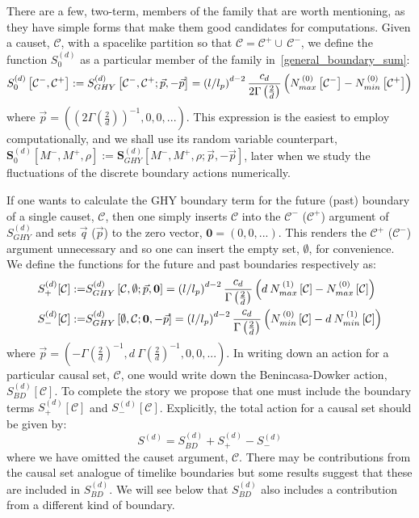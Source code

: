 \documentclass[12pt]{article}
\newcommand{\be}{\begin{equation}}
\newcommand{\ee}{\end{equation}}
\begin{document}
There are a few, two-term, members of the family that are worth mentioning, as they have simple forms that make them good candidates for computations. Given a causet, $\mathcal{C}$, with a spacelike partition so that $\mathcal C = \mathcal C^+ \cup\, \mathcal C^-$, we define the function $S^{ (d)}_0$ as a particular member of the family in~\eqref{general_boundary_sum}:
\be\label{eq:min_max_simple_formula}
S^{ (d)}_{0}\left[\mathcal{C}^-,\mathcal{C}^+\right]:=S^{ (d)}_{GHY}\left[\mathcal{C}^-,\mathcal{C}^+;\vec{p}, -\vec{p} \right]=\left (l/l_p\right)^{d-2}\frac{c_{d}}{2\Gamma\left (\frac{2}{d} \right)}\left ( N_{\vphantom{i}max}^{\: (0)}\left[\mathcal{C}^- \right] - N_{min}^{\: (0)}\left[\mathcal{C}^+ \right] \right)
\ee
where $\vec{p}=\left (\left (2\Gamma\left (\frac{2}{d} \right)\right)^{-1},0,0,...\right)$.
This expression is the easiest to employ computationally, and we shall use its random variable counterpart, $\textbf{S}^{ (d)}_{0}\left[M^-,M^+,\rho\right]:=\textbf{S}^{ (d)}_{GHY}\left[M^-,M^+,\rho;\vec{p}, -\vec{p} \right]$, later when we study the fluctuations of the discrete boundary actions numerically.

If one wants to calculate the GHY boundary term for the future (past) boundary of a single causet, $\mathcal{C}$, then one simply inserts $\mathcal{C}$ into the $\mathcal{C}^-$ ($\mathcal{C}^+$) argument of $S^{ (d)}_{GHY}$ and sets $\vec{q}$ ($\vec{p}$) to the zero vector, $\mathbf{0}= (0,0,...)$. This renders the $\mathcal{C}^+$ ($\mathcal{C}^-$) argument unnecessary and so one can insert the empty set, $\emptyset$, for convenience. We define the functions for the future and past boundaries respectively as:
\begin{align}\label{eq:future_past_boundary_terms1}
S^{ (d)}_{+}[\mathcal{C}]:= & S^{ (d)}_{GHY}\left[\mathcal{C},\emptyset;\vec{p},\mathbf{0}\right] =\left (l/l_p\right)^{d-2}\frac{c_{d}}{\Gamma\left (\frac{2}{d} \right)}\left ( d\:N_{\vphantom{i}max}^{\: (1)}\left[\mathcal{C} \right] - N_{\vphantom{i}max}^{\: (0)}\left[\mathcal{C} \right] \right)
\\
\label{eq:future_past_boundary_terms2}
S^{ (d)}_{-}[\mathcal{C}]:= & S^{ (d)}_{GHY}\left[\emptyset,\mathcal{C};\mathbf{0},-\vec{p}\right] =\left (l/l_p\right)^{d-2}\frac{c_{d}}{\Gamma\left (\frac{2}{d} \right)}\left ( N_{min}^{\: (0)}\left[\mathcal{C} \right] - d\: N_{min}^{\: (1)}\left[\mathcal{C} \right] \right)
\end{align}
where $\vec{p}=\left (-\Gamma\left (\frac{2}{d} \right)^{-1},d\:\Gamma\left (\frac{2}{d} \right)^{-1},0,0,...\right)$. In writing down an action for a particular causal set, $\mathcal{C}$, one would write down the Benincasa-Dowker action, $S^{ (d)}_{BD}[\mathcal{C}]$. To complete the story we propose that one must include the boundary terms $S^{ (d)}_{+}[\mathcal{C}]$ and $S^{ (d)}_{-}[\mathcal{C}]$. Explicitly, the total action for a causal set should be given by:
\be\label{eq:total_causet_action}
S^{ (d)}=S^{ (d)}_{BD}+S^{ (d)}_{+}-S^{ (d)}_{-}
\ee
where we have omitted the causet argument, $\mathcal{C}$. There may be contributions from the causal set analogue of timelike boundaries but some results suggest that these are included in $S^{ (d)}_{BD}$. We will see below that $S^{ (d)}_{BD}$ also includes a contribution from a different kind of boundary.
\end{document}
